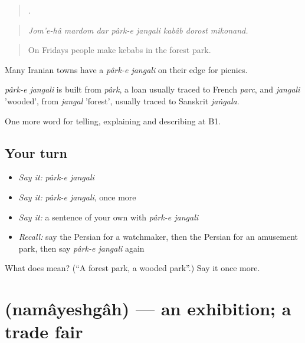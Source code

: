 \begin{quote}
        .
\end{quote}

\begin{quote}
\emph{Jom'e-hâ mardom dar pârk-e jangali kabâb dorost mikonand.}
\end{quote}

\begin{quote}
On Fridays people make kebabs in the forest park.
\end{quote}

Many Iranian towns have a \emph{pârk-e jangali} on their edge for picnics.

\begin{cousinweb}
\emph{pârk-e jangali} is built from \emph{pârk}, a loan usually traced to French \emph{parc}, and \emph{jangali} 'wooded', from \emph{jangal} 'forest', usually traced to Sanskrit \emph{jaṅgala}.
\end{cousinweb}

\begin{grammarlens}[title={What you've built}]
One more word for telling, explaining and describing at B1.
\end{grammarlens}

\subsection*{Your turn}
\begin{itemize}
\raggedright
  \item \emph{Say it:} \emph{pârk-e jangali}
  \item \emph{Say it:} \emph{pârk-e jangali}, once more
  \item \emph{Say it:} a sentence of your own with \emph{pârk-e jangali}
  \item \emph{Recall:} say the Persian for a watchmaker, then the Persian for an amusement park, then say \emph{pârk-e jangali} again
\end{itemize}

\begin{tcolorbox}[breakable,colback=teal!4,colframe=teal!35!black,title={Before you move on}]
What does   mean? (\textquotedblleft{}A forest park, a wooded park\textquotedblright{}.) Say it once more.
\end{tcolorbox}
\section[\texorpdfstring{\fa{نمایشگاه} (namâyeshgâh)}{نمایشگاه (namâyeshgâh)}]{ (namâyeshgâh) — an exhibition; a trade fair}

